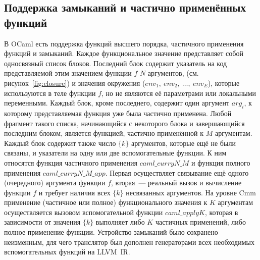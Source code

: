 \documentclass[a4paper, 12pt]{article}
\begin{document}
\subsection{Поддержка замыканий и частично применённых функций}
В OCaml есть поддержка функций высшего порядка, частичного применения функций и замыканий. Каждое функциональное
значение представляет собой односвязный список блоков. Последний блок содержит указатель на код представляемой этим
значением функции $f$ $N$ аргументов, (см. рисунок~\ref{fig:closure}) и значения окружения
($env_1,~env_2,~\dots,~env_{E}$), которые используются в теле функции $f$, но не являются её параметрами или локальными
переменными. Каждый блок, кроме последнего, содержит один аргумент $arg_i$, к которому представляемая функция уже была
частично применена. Любой фрагмент такого списка, начинающийся с некоторого блока и завершающийся последним блоком,
является функцией, частично применённой к $M$ аргументам. Каждый блок содержит также число $\{k\}$ аргументов, которые
ещё не были связаны, и указатели на одну или две вспомогательные функции. К ним относятся функция частичного применения
$caml\_curryN\_M$ и функция полного применения $caml\_curryN\_M\_app$. Первая осуществляет связывание ещё одного
(очередного) аргумента функции $f$, вторая~--- реальный вызов и вычисление функции $f$ и требует наличия всех $\{k\}$
несвязанных аргументов. На уровне Cmm применение (частичное или полное) функционального значения к $K$ аргументам
осуществляется вызовом вспомогательной функции $caml\_applyK$, которая в зависимости от значения $\{k\}$ выполняет либо
$K$ частичных применений, либо полное применение функции. Устройство замыканий было сохранено неизменным, для чего
транслятор был дополнен генераторами всех необходимых вспомогательных функций на LLVM~IR.
\end{document}
